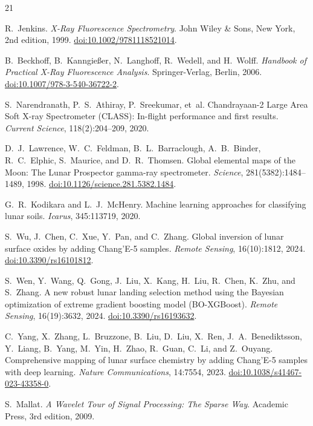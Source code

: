 \documentclass[journal,lettersize]{IEEEtran}
\providecommand{\doi}[1]{\href{https://doi.org/#1}{doi:#1}}
\begin{document}
\begin{thebibliography}{21}

R.~Jenkins.
\newblock \emph{X-Ray Fluorescence Spectrometry}.
\newblock John Wiley \& Sons, New York, 2nd edition, 1999.
\newblock \doi{10.1002/9781118521014}.

B.~Beckhoff, B.~Kanngie{\ss}er, N.~Langhoff, R.~Wedell, and H.~Wolff.
\newblock \emph{Handbook of Practical X-Ray Fluorescence Analysis}.
\newblock Springer-Verlag, Berlin, 2006.
\newblock \doi{10.1007/978-3-540-36722-2}.

S.~Narendranath, P.~S.~Athiray, P.~Sreekumar, et~al.
\newblock Chandrayaan-2 {L}arge {A}rea {S}oft {X}-ray {S}pectrometer
  ({CLASS}): {I}n-flight performance and first results.
\newblock \emph{Current Science}, 118(2):204--209, 2020.

D.~J.~Lawrence, W.~C.~Feldman, B.~L.~Barraclough, A.~B.~Binder,
  R.~C.~Elphic, S.~Maurice, and D.~R.~Thomsen.
\newblock Global elemental maps of the {M}oon: {T}he {L}unar {P}rospector
  gamma-ray spectrometer.
\newblock \emph{Science}, 281(5382):1484--1489, 1998.
\newblock \doi{10.1126/science.281.5382.1484}.

G.~R.~Kodikara and L.~J.~McHenry.
\newblock Machine learning approaches for classifying lunar soils.
\newblock \emph{Icarus}, 345:113719, 2020.

S.~Wu, J.~Chen, C.~Xue, Y.~Pan, and C.~Zhang.
\newblock Global inversion of lunar surface oxides by adding
  {C}hang'{E}-5 samples.
\newblock \emph{Remote Sensing}, 16(10):1812, 2024.
\newblock \doi{10.3390/rs16101812}.

S.~Wen, Y.~Wang, Q.~Gong, J.~Liu, X.~Kang, H.~Liu, R.~Chen, K.~Zhu, and
  S.~Zhang.
\newblock A new robust lunar landing selection method using the {B}ayesian
  optimization of extreme gradient boosting model ({BO}-{XGB}oost).
\newblock \emph{Remote Sensing}, 16(19):3632, 2024.
\newblock \doi{10.3390/rs16193632}.

C.~Yang, X.~Zhang, L.~Bruzzone, B.~Liu, D.~Liu, X.~Ren, J.~A.~Benediktsson,
  Y.~Liang, B.~Yang, M.~Yin, H.~Zhao, R.~Guan, C.~Li, and Z.~Ouyang.
\newblock Comprehensive mapping of lunar surface chemistry by adding
  {C}hang'{E}-5 samples with deep learning.
\newblock \emph{Nature Communications}, 14:7554, 2023.
\newblock \doi{10.1038/s41467-023-43358-0}.

S.~Mallat.
\newblock \emph{A Wavelet Tour of Signal Processing: The Sparse Way}.
\newblock Academic Press, 3rd edition, 2009.


\end{thebibliography}
\end{document}
